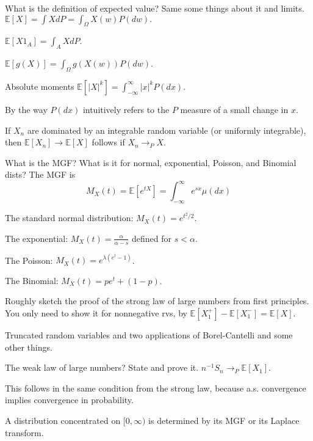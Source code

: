\documentclass[avery5388,grid,frame]{flashcards}
\newcommand{\E}{\mathbb{E}}
\begin{document}
\begin{flashcard}
    {What is the definition of expected value? Same some things about it and limits.}
    $\E[X] = \int X dP = \int_\Omega X(w) P(dw).$

    $\E[X 1_A] = \int_A X dP$.

    $\E[g(X)] = \int_\Omega g(X(w)) P(dw)$.

    Absolute moments $\E[|X|^k] = \int_{-\infty}^\infty |x|^k P(dx)$.

    By the way $P(dx)$ intuitively refers to the $P$ measure of a small change in $x$.

    If $X_n$ are dominated by an integrable random variable (or uniformly integrable), then $\E[X_n] \rightarrow \E[X]$ follows if $X_n \rightarrow_P X$.
\end{flashcard}


\begin{flashcard}
    {What is the MGF? What is it for normal, exponential, Poisson, and Binomial dists?}
    The MGF is
    $$M_X(t) = \E[e^{tX}] = \int_{-\infty}^\infty e^{sx} \mu(dx)$$

    The standard normal distribution: $M_X(t) = e^{t^2/2}$.

    The exponential: $M_X(t) = \frac{\alpha}{\alpha - s}$ defined for $s < \alpha$.

    The Poisson: $M_X(t) = e^{\lambda (e^t - 1)}$.

    The Binomial: $M_X(t) = p e^t + (1-p)$.
\end{flashcard}


\begin{flashcard}
    {Roughly sketch the proof of the strong law of large numbers from first principles.}
    You only need to show it for nonnegative rvs, by $\E[X_1^+] - \E[X_1^-] = \E[X]$.

    Truncated random variables and two applications of Borel-Cantelli and some other things.

\end{flashcard}


\begin{flashcard}
    {The weak law of large numbers? State and prove it.}
    $n^{-1} S_n \rightarrow_P \E[X_1]$.

    This follows in the same condition from the strong law, because a.s. convergence implies convergence in probability.

    A distribution concentrated on $[0,\infty)$ is determined by its MGF or its Laplace transform.
\end{flashcard}
\end{document}
